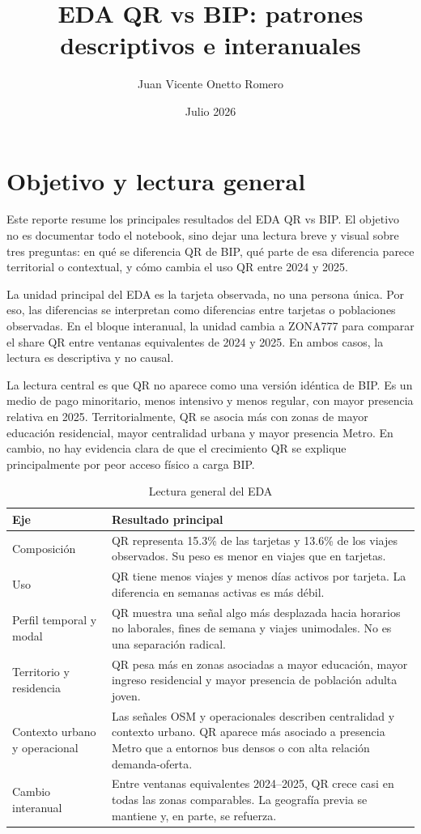 \documentclass[11pt,letterpaper]{article}
\title{EDA QR vs BIP: patrones descriptivos e interanuales}
\author{Juan Vicente Onetto Romero}
\date{Julio 2026}
\begin{document}
\maketitle

\section{Objetivo y lectura general}

Este reporte resume los principales resultados del EDA QR vs BIP. El objetivo no
es documentar todo el notebook, sino dejar una lectura breve y visual sobre tres
preguntas: en qué se diferencia QR de BIP, qué parte de esa diferencia parece
territorial o contextual, y cómo cambia el uso QR entre 2024 y 2025.

La unidad principal del EDA es la tarjeta observada, no una persona única. Por
eso, las diferencias se interpretan como diferencias entre tarjetas o
poblaciones observadas. En el bloque interanual, la unidad cambia a ZONA777 para
comparar el share QR entre ventanas equivalentes de 2024 y 2025. En ambos casos,
la lectura es descriptiva y no causal.

La lectura central es que QR no aparece como una versión idéntica de BIP. Es un
medio de pago minoritario, menos intensivo y menos regular, con mayor presencia
relativa en 2025. Territorialmente, QR se asocia más con zonas de mayor educación
residencial, mayor centralidad urbana y mayor presencia Metro. En cambio, no hay
evidencia clara de que el crecimiento QR se explique principalmente por peor
acceso físico a carga BIP.

\begin{table}[H]
\centering
\caption{Lectura general del EDA}
\small
\setlength{\tabcolsep}{5pt}
\renewcommand{\arraystretch}{1.22}
\begin{tabularx}{\textwidth}{>{\raggedright\arraybackslash}p{4.0cm} >{\raggedright\arraybackslash}X}
\toprule
Eje & Resultado principal \\
\midrule
Composición & QR representa 15.3\% de las tarjetas y 13.6\% de los viajes observados. Su peso es menor en viajes que en tarjetas. \\
Uso & QR tiene menos viajes y menos días activos por tarjeta. La diferencia en semanas activas es más débil. \\
Perfil temporal y modal & QR muestra una señal algo más desplazada hacia horarios no laborales, fines de semana y viajes unimodales. No es una separación radical. \\
Territorio y residencia & QR pesa más en zonas asociadas a mayor educación, mayor ingreso residencial y mayor presencia de población adulta joven. \\
Contexto urbano y operacional & Las señales OSM y operacionales describen centralidad y contexto urbano. QR aparece más asociado a presencia Metro que a entornos bus densos o con alta relación demanda-oferta. \\
Cambio interanual & Entre ventanas equivalentes 2024--2025, QR crece casi en todas las zonas comparables. La geografía previa se mantiene y, en parte, se refuerza. \\
\bottomrule
\end{tabularx}
\end{table}
\end{document}
